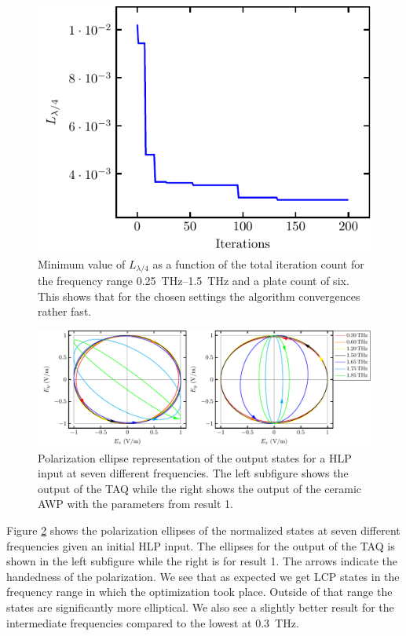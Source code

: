 \begin{figure}[H]
    \centering
    \includegraphics[scale=0.75]{images/results/plots/ceramic/convergence.pdf}
    \caption{Minimum value of $L_{\lambda/4}$ as a function of the total iteration count for the frequency range \SIrange{0.25}{1.5}{\tera \hertz} and a plate count of six. This shows that for the chosen settings the algorithm convergences rather fast.}
    \label{fig:cl4_convergence}
\end{figure}

\begin{figure}[H]
    \centering
    \includegraphics[scale=0.7]{images/results/plots/ceramic/pe_cl4_lp.pdf}
    \caption{Polarization ellipse representation of the output states for a HLP input at seven different frequencies. The left subfigure shows the output of the TAQ while the right shows the output of the ceramic AWP with the parameters from result 1.}
    \label{fig:cl4_pe_lp}
\end{figure}

Figure \ref{fig:cl4_pe_lp} shows the polarization ellipses of the normalized states at seven different frequencies given an initial HLP input. The ellipses for the output of the TAQ is shown in the left subfigure while the right is for result 1. The arrows indicate the handedness of the polarization. We see that as expected we get LCP states in the frequency range in which the optimization took place. Outside of that range the states are significantly more elliptical. We also see a slightly better result for the intermediate frequencies compared to the lowest at \SI{0.3}{\tera \hertz}. 

